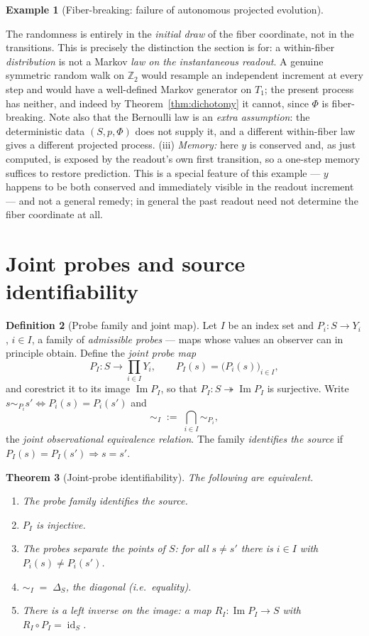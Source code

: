 \documentclass[11pt,reqno]{amsart}
\theoremstyle{plain}
\newtheorem{theorem}{Theorem}[section]
\theoremstyle{definition}
\newtheorem{definition}[theorem]{Definition}
\newtheorem{example}[theorem]{Example}
\theoremstyle{remark}
\DeclareMathOperator{\Ima}{Im}
\DeclareMathOperator{\id}{id}
\begin{document}
\begin{example}[Fiber-breaking: failure of autonomous projected evolution]
\begin{itemize}
\end{itemize}
The randomness is entirely in the \emph{initial draw} of the fiber coordinate, not in the transitions. This is precisely the distinction the section is for: a within-fiber \emph{distribution} is not a Markov \emph{law on the instantaneous readout}. A genuine symmetric random walk on $\mathbb Z_2$ would resample an independent increment at every step and would have a well-defined Markov generator on $T_1$; the present process has neither, and indeed by Theorem~\ref{thm:dichotomy} it cannot, since $\Phi$ is fiber-breaking. Note also that the Bernoulli law is an \emph{extra assumption}: the deterministic data $(S,p,\Phi)$ does not supply it, and a different within-fiber law gives a different projected process. (iii) \emph{Memory:} here $y$ is conserved and, as just computed, is exposed by the readout's own first transition, so a one-step memory suffices to restore prediction. This is a special feature of this example --- $y$ happens to be both conserved and immediately visible in the readout increment --- and not a general remedy; in general the past readout need not determine the fiber coordinate at all.
\end{example}

\section{Joint probes and source identifiability}\label{sec:probes}

\begin{definition}[Probe family and joint map]\label{def:probes}
Let $I$ be an index set and $P_i\colon S\to Y_i$, $i\in I$, a family of \emph{admissible probes} --- maps whose values an observer can in principle obtain. Define the \emph{joint probe map}
\[
P_I\colon S\longrightarrow \prod_{i\in I}Y_i,\qquad P_I(s)=\bigl(P_i(s)\bigr)_{i\in I},
\]
and corestrict it to its image $\Ima P_I$, so that $P_I\colon S\twoheadrightarrow\Ima P_I$ is surjective. Write $s\sim_{P_i}s'\iff P_i(s)=P_i(s')$ and
\[
\sim_I\;:=\;\bigcap_{i\in I}\sim_{P_i},
\]
the \emph{joint observational equivalence relation}. The family \emph{identifies the source} if $P_I(s)=P_I(s')\Rightarrow s=s'$.
\end{definition}

\begin{theorem}[Joint-probe identifiability]\label{thm:identifiability}
The following are equivalent.
\begin{enumerate}
\item[(I1)] The probe family identifies the source.
\item[(I2)] $P_I$ is injective.
\item[(I3)] The probes separate the points of $S$: for all $s\neq s'$ there is $i\in I$ with $P_i(s)\neq P_i(s')$.
\item[(I4)] $\sim_I\;=\;\Delta_S$, the diagonal (i.e.\ equality).
\item[(I5)] There is a left inverse on the image: a map $R_I\colon\Ima P_I\to S$ with $R_I\circ P_I=\id_S$.
\end{enumerate}
\end{theorem}
\end{document}
